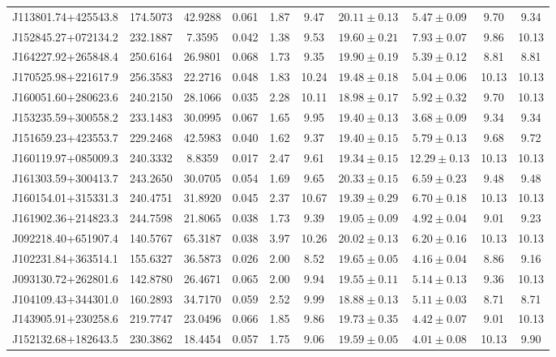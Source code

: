 \documentclass[fleqn,usenatbib]{mnras}
\begin{document}
\begin{table*}
\begin{tabular}{lccccccccc}
J113801.74+425543.8	&	174.5073	&	42.9288	&	0.061	&	1.87	&	9.47	&	$	20.11	\pm	0.13	$	&	$	5.47	\pm	0.09	$	&	9.70	&	9.34	\\
J152845.27+072134.2	&	232.1887	&	7.3595	&	0.042	&	1.38	&	9.53	&	$	19.60	\pm	0.21	$	&	$	7.93	\pm	0.07	$	&	9.86	&	10.13	\\
J164227.92+265848.4	&	250.6164	&	26.9801	&	0.068	&	1.73	&	9.35	&	$	19.90	\pm	0.19	$	&	$	5.39	\pm	0.12	$	&	8.81	&	8.81	\\
J170525.98+221617.9	&	256.3583	&	22.2716	&	0.048	&	1.83	&	10.24	&	$	19.48	\pm	0.18	$	&	$	5.04	\pm	0.06	$	&	10.13	&	10.13	\\
J160051.60+280623.6	&	240.2150	&	28.1066	&	0.035	&	2.28	&	10.11	&	$	18.98	\pm	0.17	$	&	$	5.92	\pm	0.32	$	&	9.70	&	10.13	\\
J153235.59+300558.2	&	233.1483	&	30.0995	&	0.067	&	1.65	&	9.95	&	$	19.40	\pm	0.13	$	&	$	3.68	\pm	0.09	$	&	9.34	&	9.34	\\
J151659.23+423553.7	&	229.2468	&	42.5983	&	0.040	&	1.62	&	9.37	&	$	19.40	\pm	0.15	$	&	$	5.79	\pm	0.13	$	&	9.68	&	9.72	\\
J160119.97+085009.3	&	240.3332	&	8.8359	&	0.017	&	2.47	&	9.61	&	$	19.34	\pm	0.15	$	&	$	12.29	\pm	0.13	$	&	10.13	&	10.13	\\
J161303.59+300413.7	&	243.2650	&	30.0705	&	0.054	&	1.69	&	9.65	&	$	20.33	\pm	0.15	$	&	$	6.59	\pm	0.23	$	&	9.48	&	9.48	\\
J160154.01+315331.3	&	240.4751	&	31.8920	&	0.045	&	2.37	&	10.67	&	$	19.39	\pm	0.29	$	&	$	6.70	\pm	0.18	$	&	10.13	&	10.13	\\
J161902.36+214823.3	&	244.7598	&	21.8065	&	0.038	&	1.73	&	9.39	&	$	19.05	\pm	0.09	$	&	$	4.92	\pm	0.04	$	&	9.01	&	9.23	\\
J092218.40+651907.4	&	140.5767	&	65.3187	&	0.038	&	3.97	&	10.26	&	$	20.02	\pm	0.13	$	&	$	6.20	\pm	0.16	$	&	10.13	&	10.13	\\
J102231.84+363514.1	&	155.6327	&	36.5873	&	0.026	&	2.00	&	8.52	&	$	19.65	\pm	0.05	$	&	$	4.16	\pm	0.04	$	&	8.86	&	9.16	\\
J093130.72+262801.6	&	142.8780	&	26.4671	&	0.065	&	2.00	&	9.94	&	$	19.55	\pm	0.11	$	&	$	5.14	\pm	0.13	$	&	9.36	&	10.13	\\
J104109.43+344301.0	&	160.2893	&	34.7170	&	0.059	&	2.52	&	9.99	&	$	18.88	\pm	0.13	$	&	$	5.11	\pm	0.03	$	&	8.71	&	8.71	\\
J143905.91+230258.6	&	219.7747	&	23.0496	&	0.066	&	1.85	&	9.86	&	$	19.73	\pm	0.35	$	&	$	4.42	\pm	0.07	$	&	9.01	&	10.13	\\
J152132.68+182643.5	&	230.3862	&	18.4454	&	0.057	&	1.75	&	9.06	&	$	19.59	\pm	0.05	$	&	$	4.01	\pm	0.08	$	&	10.13	&	9.90	\\

\end{tabular}
\end{table*}
\end{document}
